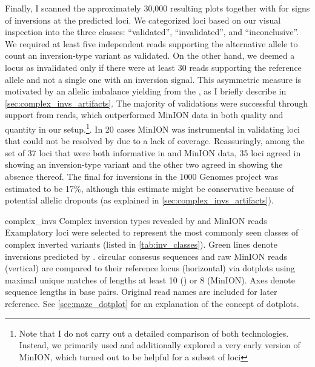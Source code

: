 Finally, I scanned the approximately 30,000 resulting plots together with
\adrian for signs of inversions at the predicted loci. We categorized loci based
on our visual inspection into the three classes: ``validated'', ``invalidated'',
and ``inconclusive''.  We required at least five independent reads supporting
the alternative allele to count an inversion-type variant as validated. On the
other hand, we deemed a locus as invalidated only if there were at least 30
reads supporting the reference allele and not a single one with an inversion
signal. This asymmetric measure is motivated by an allelic imbalance yielding
from the \pcr, as I briefly describe in \cref{sec:complex_invs_artifacts}. The
majority of validations were successful through support from \pacbio reads,
which outperformed \ont MinION data in both quality and quantity in our
setup.\footnote{Note that I do not carry out a detailed comparison of both
technologies. Instead, we primarily used \pacbio and additionally explored a
very early version of \ont MinION, which turned out to be helpful for a subset of
loci}. In 20 cases \ont MinION was instrumental in validating loci that could not be
resolved by \pacbio due to a lack of coverage. Reassuringly, among the set of 37
loci that were both informative in \pacbio and \ont MinION data, 35 loci agreed in
showing an inversion-type variant and the other two agreed in showing the
absence thereof. The final \fdr for inversions in the 1000 Genomes project was
estimated to be 17\%, although this estimate might be conservative because of
potential allelic dropouts (as explained in \cref{sec:complex_invs_artifacts}).

    {complex_invs}
    {Complex inversion types revealed by \pacbio and \ont MinION reads}
    {Examplatory loci were selected to represent the most commonly seen
    classes of complex inverted variants (listed in \cref{tab:inv_classes}).
    Green lines denote inversions predicted by \delly. \pacbio circular
    consesus sequences and raw \ont MinION reads (vertical) are compared to their
    reference locus (horizontal) via dotplots using maximal unique matches
    of lengths at least 10 (\pacbio) or 8 (MinION). Axes denote sequence lengths
    in base pairs. Original read names are included for later reference. See
    \cref{sec:maze_dotplot} for an explanation of the concept of dotplots.}

